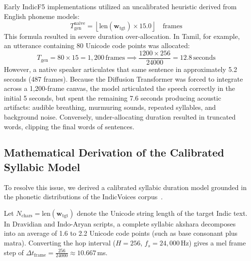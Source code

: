 Early IndicF5 implementations utilized an uncalibrated heuristic derived from English phoneme models:
\begin{equation}
    T_{\text{gen}}^{\text{naive}} = \left\lfloor \text{len}(\mathbf{w}_{\text{tgt}}) \times 15.0 \right\rfloor \quad \text{frames}
    \label{eq:naive_duration}
\end{equation}
This formula resulted in severe duration over-allocation. In Tamil, for example, an utterance containing 80 Unicode code points was allocated:
\begin{equation}
    T_{\text{gen}} = 80 \times 15 = 1,200\,\text{frames} \implies \frac{1200 \times 256}{24000} = 12.8\,\text{seconds}
\end{equation}
However, a native speaker articulates that same sentence in approximately 5.2 seconds (487 frames). Because the Diffusion Transformer was forced to integrate across a 1,200-frame canvas, the model articulated the speech correctly in the initial 5 seconds, but spent the remaining 7.6 seconds producing acoustic artifacts: audible breathing, murmuring sounds, repeated syllables, and background noise. Conversely, under-allocating duration resulted in truncated words, clipping the final words of sentences.

\subsection{Mathematical Derivation of the Calibrated Syllabic Model}
To resolve this issue, we derived a calibrated syllabic duration model grounded in the phonetic distributions of the IndicVoices corpus~\cite{indicvoices2024}. 

Let $N_{\text{chars}} = \text{len}(\mathbf{w}_{\text{tgt}})$ denote the Unicode string length of the target Indic text. In Dravidian and Indo-Aryan scripts, a complete syllabic akshara decomposes into an average of 1.6 to 2.2 Unicode code points (such as base consonant plus matra). Converting the hop interval ($H = 256$, $f_s = 24,000$\,Hz) gives a mel frame step of $\Delta t_{\text{frame}} = \frac{256}{24000} \approx 10.667$\,ms. 

